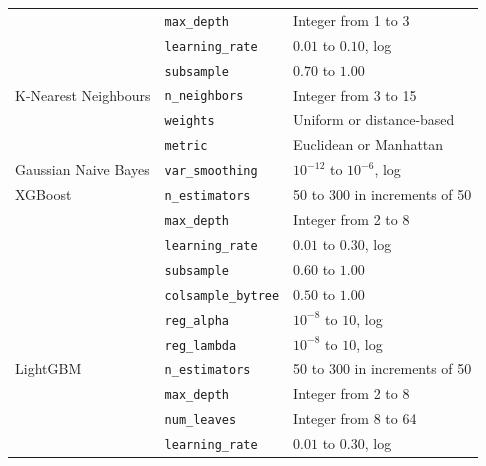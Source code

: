 \documentclass[12pt,twocolumn]{article}
\begin{document}
\begin{table}[htbp]
\begin{tabularx}{\textwidth}{p{3.0cm} p{3.4cm} X}
& \texttt{max\_depth}
& Integer from 1 to 3 \\

& \texttt{learning\_rate}
& \(0.01\) to \(0.10\), log \\

& \texttt{subsample}
& \(0.70\) to \(1.00\) \\

\midrule

K-Nearest Neighbours
& \texttt{n\_neighbors}
& Integer from 3 to 15 \\

& \texttt{weights}
& Uniform or distance-based \\

& \texttt{metric}
& Euclidean or Manhattan \\

\midrule

Gaussian Naive Bayes
& \texttt{var\_smoothing}
& \(10^{-12}\) to \(10^{-6}\), log \\

\midrule

XGBoost
& \texttt{n\_estimators}
& 50 to 300 in increments of 50 \\

& \texttt{max\_depth}
& Integer from 2 to 8 \\

& \texttt{learning\_rate}
& \(0.01\) to \(0.30\), log \\

& \texttt{subsample}
& \(0.60\) to \(1.00\) \\

& \texttt{colsample\_bytree}
& \(0.50\) to \(1.00\) \\

& \texttt{reg\_alpha}
& \(10^{-8}\) to \(10\), log \\

& \texttt{reg\_lambda}
& \(10^{-8}\) to \(10\), log \\

\midrule

LightGBM
& \texttt{n\_estimators}
& 50 to 300 in increments of 50 \\

& \texttt{max\_depth}
& Integer from 2 to 8 \\

& \texttt{num\_leaves}
& Integer from 8 to 64 \\

& \texttt{learning\_rate}
& \(0.01\) to \(0.30\), log \\


\end{tabularx}
\end{table}
\end{document}
